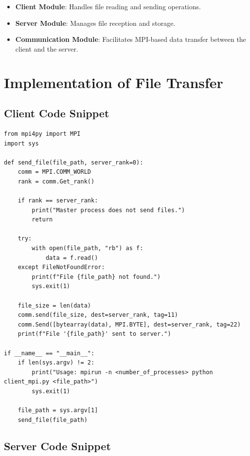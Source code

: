 \documentclass{article}
\begin{document}
\begin{itemize}
    \item \textbf{Client Module}: Handles file reading and sending operations.
    \item \textbf{Server Module}: Manages file reception and storage.
    \item \textbf{Communication Module}: Facilitates MPI-based data transfer between the client and the server.
\end{itemize}

\section{Implementation of File Transfer}

\subsection{Client Code Snippet}

\begin{lstlisting}[style=mypython, caption=MPI Client Implementation]
from mpi4py import MPI
import sys

def send_file(file_path, server_rank=0):
    comm = MPI.COMM_WORLD
    rank = comm.Get_rank()

    if rank == server_rank:
        print("Master process does not send files.")
        return

    try:
        with open(file_path, "rb") as f:
            data = f.read()
    except FileNotFoundError:
        print(f"File {file_path} not found.")
        sys.exit(1)

    file_size = len(data)
    comm.send(file_size, dest=server_rank, tag=11)
    comm.Send([bytearray(data), MPI.BYTE], dest=server_rank, tag=22)
    print(f"File '{file_path}' sent to server.")

if __name__ == "__main__":
    if len(sys.argv) != 2:
        print("Usage: mpirun -n <number_of_processes> python client_mpi.py <file_path>")
        sys.exit(1)

    file_path = sys.argv[1]
    send_file(file_path)
\end{lstlisting}

\subsection{Server Code Snippet}
\end{document}
